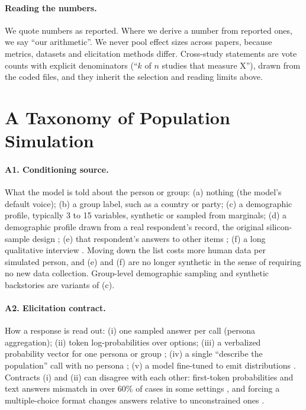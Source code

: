 \documentclass[11pt]{article}
\begin{document}
\paragraph{Reading the numbers.} We quote numbers as reported. Where we derive a number from reported ones, we say ``our arithmetic''. We never pool effect sizes across papers, because metrics, datasets and elicitation methods differ. Cross-study statements are vote counts with explicit denominators (``$k$ of $n$ studies that measure X''), drawn from the coded files, and they inherit the selection and reading limits above.

\section{A Taxonomy of Population Simulation}
\label{sec:taxonomy}

\paragraph{A1. Conditioning source.} What the model is told about the person or group: (a) nothing (the model's default voice); (b) a group label, such as a country or party; (c) a demographic profile, typically 3 to 15 variables, synthetic or sampled from marginals; (d) a demographic profile drawn from a real respondent's record, the original silicon-sample design \citep{argyle2023}; (e) that respondent's answers to other items \citep{ku2026,lee2026openweight,toubia2025twin}; (f) a long qualitative interview \citep{park2024}. Moving down the list costs more human data per simulated person, and (e) and (f) are no longer synthetic in the sense of requiring no new data collection. Group-level demographic sampling \citep{sun2024random} and synthetic backstories \citep{moon2024anthology} are variants of (c).

\paragraph{A2. Elicitation contract.} How a response is read out: (i) one sampled answer per call (persona aggregation); (ii) token log-probabilities over options; (iii) a verbalized probability vector for one persona or group \citep{meister2024,zhang2025vs}; (iv) a single ``describe the population'' call with no persona \citep{jang2026,doudkin2026}; (v) a model fine-tuned to emit distributions \citep{suh2025subpop,cao2025}. Contracts (i) and (ii) can disagree with each other: first-token probabilities and text answers mismatch in over 60\% of cases in some settings \citep{wang2024myanswer}, and forcing a multiple-choice format changes answers relative to unconstrained ones \citep{rottger2024}.
\end{document}
